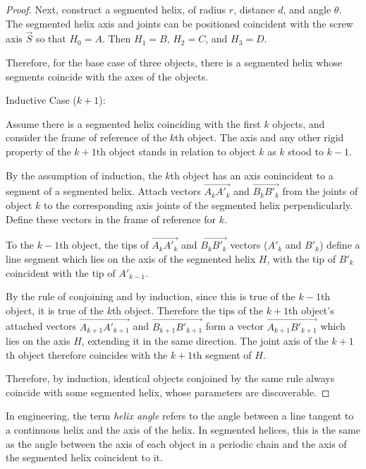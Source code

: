 \documentclass[11pt]{article}
\begin{document}
{\begin{proof}
  Next, construct a segmented helix, of radius $r$, distance $d$,
  and angle $\theta$. The segmented helix axis and joints can be positioned coincident with the screw axis
  $\overrightarrow{S}$ so
  that $H_0 = A$. Then $H_1=B$, $H_2=C$, and $H_3=D$.

  Therefore, for the base case of three objects, there is a segmented helix whose
  segments coincide with the axes of the objects.


  Inductive Case ($k+1$):

  Assume there is a segmented helix coinciding with the first $k$ objects, and
  consider the frame of reference of the $k$th object. The axis and any
  other rigid property of the $k+1$th object stands in relation to object $k$
  as $k$ stood to $k-1$.

  By the assumption of induction, the $k$th object has an axis conincident to
  a segment
  of a segmented helix. Attach vectors $\overrightarrow{A_{k}A'_{k}}$ and $\overrightarrow{B_{k}B'_{k}}$
  from the
  joints of object $k$ to the corresponding axis joints of the segmented helix perpendicularly. Define these
  vectors in the frame of reference for $k$.

  To the $k-1$th object, the tips of  $\overrightarrow{A_{k}A'_{k}}$ and $\overrightarrow{B_{k}B'_{k}}$ vectors ($A'_{k}$ and $B'_{k}$) define
  a line segment which lies on the axis of the segmented helix $H$, with the
  tip of $B'_{k}$ coincident with the tip of $A'_{k-1}$.

  By the rule of conjoining and by induction, since this is true of the $k-1$th object,
  it is true of the $k$th object. Therefore the tips of the $k+1$th object's attached vectors
  $\overrightarrow{A_{k+1}A'_{k+1}}$ and $\overrightarrow{B_{k+1}B'_{k+1}}$
  form a vector $\overrightarrow{A_{k+1}B'_{k+1}}$ which lies on the axis $H$, extending it
  in the same direction. The joint axis of the $k+1$th object therefore coincides
  with the $k+1$th segment of $H$.

  Therefore, by induction, identical objects conjoined by the same rule always
  coincide with some segmented helix, whose parameters are discoverable.
\end{proof}

In engineering, the term {\em helix angle} refers
to the angle between a line tangent to a continuous helix and
the axis of the helix. In segmented helices, this is the same
as the angle between the
axis of each object in a periodic chain and the axis of the
segmented helix coincident to it.

}
\end{document}
